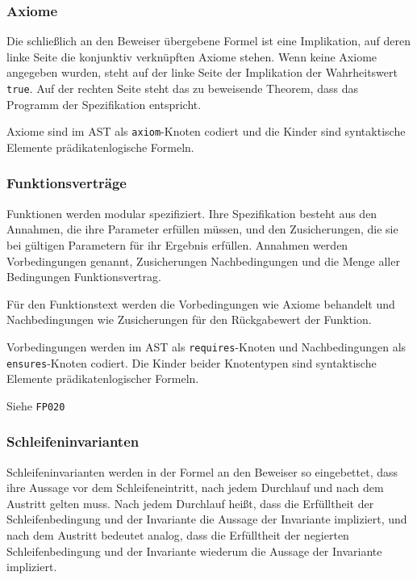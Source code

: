 \subsubsection{Axiome}%

Die schließlich an den Beweiser übergebene Formel ist eine
Implikation, auf deren linke Seite die konjunktiv verknüpften Axiome
stehen. Wenn keine Axiome angegeben wurden, steht auf der linke Seite
der Implikation der Wahrheitswert \texttt{true}. Auf der rechten Seite
steht das zu beweisende Theorem, dass das Programm der Spezifikation
entspricht.%

Axiome sind im AST als \texttt{axiom}-Knoten codiert und die Kinder
sind syntaktische Elemente prädikatenlogische Formeln.%

\subsubsection{Funktionsverträge}%

Funktionen werden modular spezifiziert. Ihre Spezifikation besteht aus
den Annahmen, die ihre Parameter erfüllen müssen, und den
Zusicherungen, die sie bei gültigen Parametern für ihr Ergebnis
erfüllen. Annahmen werden Vorbedingungen genannt, Zusicherungen
Nachbedingungen und die Menge aller Bedingungen Funktionsvertrag.%

Für den Funktionstext werden die Vorbedingungen wie Axiome behandelt
und Nachbedingungen wie Zusicherungen für den Rückgabewert der
Funktion.%

Vorbedingungen werden im AST als \texttt{requires}-Knoten und
Nachbedingungen als \texttt{ensures}-Knoten codiert. Die Kinder beider
Knotentypen sind syntaktische Elemente prädikatenlogischer Formeln.%

Siehe \texttt{FP020}%

\subsubsection{Schleifeninvarianten}%

Schleifeninvarianten werden in der Formel an den Beweiser so
eingebettet, dass ihre Aussage vor dem Schleifeneintritt, nach jedem
Durchlauf und nach dem Austritt gelten muss. Nach jedem Durchlauf
heißt, dass die Erfülltheit der Schleifenbedingung und der Invariante
die Aussage der Invariante impliziert, und nach dem Austritt bedeutet
analog, dass die Erfülltheit der negierten Schleifenbedingung und der
Invariante wiederum die Aussage der Invariante impliziert.%

